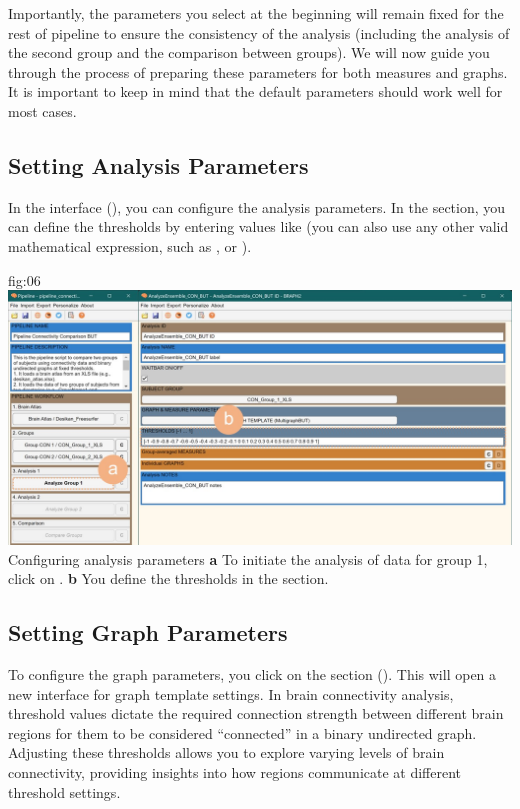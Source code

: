 \documentclass[justified]{tufte-handout}
\begin{document}
Importantly, the parameters you select at the beginning will remain fixed for the rest of pipeline to ensure the consistency of the analysis (including the analysis of the second group and the comparison between groups). We will now guide you through the process of preparing these parameters for both measures and graphs. It is important to keep in mind that the default parameters should work well for most cases.

\subsection{Setting Analysis Parameters}

In the  interface (), you can configure the analysis parameters.
In the  section, you can define the thresholds by entering values like  (you can also use any other valid mathematical expression, such as , or ).

{fig:06}
{
	\includegraphics{fig06.jpg}
}
{Configuring analysis parameters}
{
	{\bf a} To initiate the analysis of data for group 1, click on .
	{\bf b} You define the thresholds in the  section.
}

\subsection{Setting Graph Parameters}

To configure the graph parameters, you click on the section  (). This will open a new interface for graph template settings. 
In brain connectivity analysis, threshold values dictate the required connection strength between different brain regions for them to be considered “connected” in a binary undirected graph. 
Adjusting these thresholds allows you to explore varying levels of brain connectivity, providing insights into how regions communicate at different threshold settings.
\end{document}
